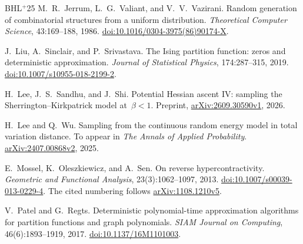 \documentclass[10pt]{article}
\theoremstyle{plain}
\theoremstyle{definition}
\theoremstyle{remark}
\begin{document}
\begin{thebibliography}{BHL$^+$25}
M.~R.~Jerrum, L.~G.~Valiant, and V.~V.~Vazirani.
\newblock Random generation of combinatorial structures from a uniform distribution.
\newblock \emph{Theoretical Computer Science}, 43:169--188, 1986.
\newblock \href{https://doi.org/10.1016/0304-3975(86)90174-X}{doi:10.1016/0304-3975(86)90174-X}.

J.~Liu, A.~Sinclair, and P.~Srivastava.
\newblock The Ising partition function: zeros and deterministic approximation.
\newblock \emph{Journal of Statistical Physics}, 174:287--315, 2019.
\newblock \href{https://doi.org/10.1007/s10955-018-2199-2}{doi:10.1007/s10955-018-2199-2}.

H.~Lee, J.~S.~Sandhu, and J.~Shi.
\newblock Potential Hessian ascent IV: sampling the Sherrington--Kirkpatrick model at~$\beta<1$.
\newblock Preprint, \href{https://arxiv.org/abs/2609.30590v1}{arXiv:2609.30590v1}, 2026.

H.~Lee and Q.~Wu.
\newblock Sampling from the continuous random energy model in total variation distance.
\newblock To appear in \emph{The Annals of Applied Probability}.
\newblock \href{https://arxiv.org/abs/2407.00868v2}{arXiv:2407.00868v2}, 2025.

E.~Mossel, K.~Oleszkiewicz, and A.~Sen.
\newblock On reverse hypercontractivity.
\newblock \emph{Geometric and Functional Analysis}, 23(3):1062--1097, 2013.
\newblock \href{https://doi.org/10.1007/s00039-013-0229-4}{doi:10.1007/s00039-013-0229-4}.
\newblock The cited numbering follows \href{https://arxiv.org/abs/1108.1210v5}{arXiv:1108.1210v5}.

V.~Patel and G.~Regts.
\newblock Deterministic polynomial-time approximation algorithms for partition functions and graph polynomials.
\newblock \emph{SIAM Journal on Computing}, 46(6):1893--1919, 2017.
\newblock \href{https://doi.org/10.1137/16M1101003}{doi:10.1137/16M1101003}.

\end{thebibliography}
\end{document}
